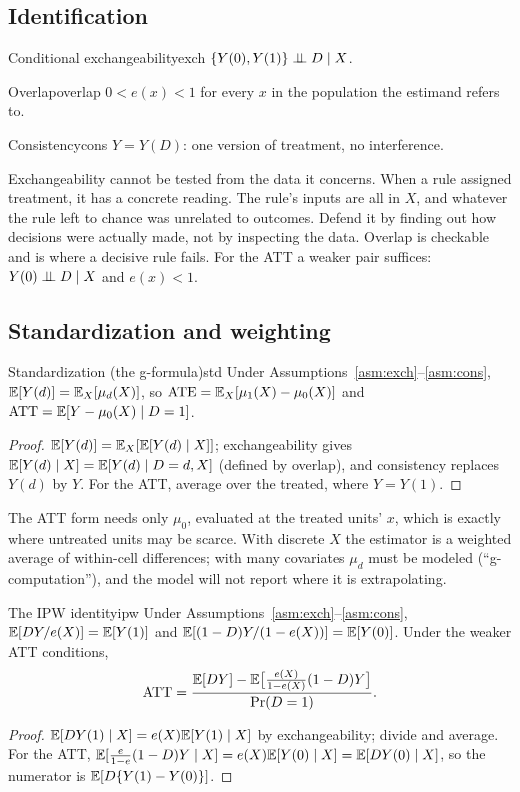 \documentclass[11pt]{article}
\begin{document}
\subsection{Identification}

\begin{assum}{Conditional exchangeability}{exch}
$\{Y(0), Y(1)\} \perp\!\!\!\perp D \mid X$.
\end{assum}
\begin{assum}{Overlap}{overlap}
$0 < e(x) < 1$ for every $x$ in the population the estimand refers to.
\end{assum}
\begin{assum}{Consistency}{cons}
$Y = Y(D)$: one version of treatment, no interference.
\end{assum}

Exchangeability cannot be tested from the data it concerns. When a rule assigned treatment, it has a concrete reading. The
rule's inputs are all in $X$, and whatever the rule left to chance was unrelated to outcomes. Defend it by finding out how
decisions were actually made, not by inspecting the data. Overlap is checkable and is where a decisive rule fails. For the ATT a weaker
pair suffices: $Y(0) \perp\!\!\!\perp D \mid X$ and $e(x) < 1$.

\subsection{Standardization and weighting}

\begin{prop}{Standardization (the g-formula)}{std}
Under Assumptions~\ref{asm:exch}--\ref{asm:cons}, $\mathbb{E}[Y(d)] = \mathbb{E}_X[\mu_d(X)]$, so $\text{ATE} = \mathbb{E}_X[\mu_1(X) - \mu_0(X)]$ and
$\text{ATT} = \mathbb{E}[Y - \mu_0(X) \mid D = 1]$.
\end{prop}
\begin{proof}
$\mathbb{E}[Y(d)] = \mathbb{E}_X[\mathbb{E}[Y(d) \mid X]]$; exchangeability gives $\mathbb{E}[Y(d) \mid X] = \mathbb{E}[Y(d) \mid D=d, X]$ (defined by overlap), and
consistency replaces $Y(d)$ by $Y$. For the ATT, average over the treated, where $Y = Y(1)$.
\end{proof}

The ATT form needs only $\mu_0$, evaluated at the treated units' $x$, which is exactly where untreated units may be scarce.
With discrete $X$ the estimator is a weighted average of within-cell differences; with many covariates $\mu_d$ must be
modeled (``g-computation''), and the model will not report where it is extrapolating.

\begin{prop}{The IPW identity}{ipw}
Under Assumptions~\ref{asm:exch}--\ref{asm:cons}, $\mathbb{E}[DY/e(X)] = \mathbb{E}[Y(1)]$ and $\mathbb{E}[(1-D)Y/(1-e(X))] = \mathbb{E}[Y(0)]$. Under the
weaker ATT conditions,
\[
  \text{ATT} = \frac{\mathbb{E}[DY] - \mathbb{E}\big[\tfrac{e(X)}{1-e(X)}(1-D)Y\big]}{\Pr(D=1)} .
\]
\end{prop}
\begin{proof}
$\mathbb{E}[DY(1) \mid X] = e(X)\mathbb{E}[Y(1) \mid X]$ by exchangeability; divide and average. For the ATT,
$\mathbb{E}[\tfrac{e}{1-e}(1-D)Y \mid X] = e(X)\mathbb{E}[Y(0) \mid X] = \mathbb{E}[DY(0) \mid X]$, so the numerator is $\mathbb{E}[D\{Y(1) - Y(0)\}]$.
\end{proof}
\end{document}
